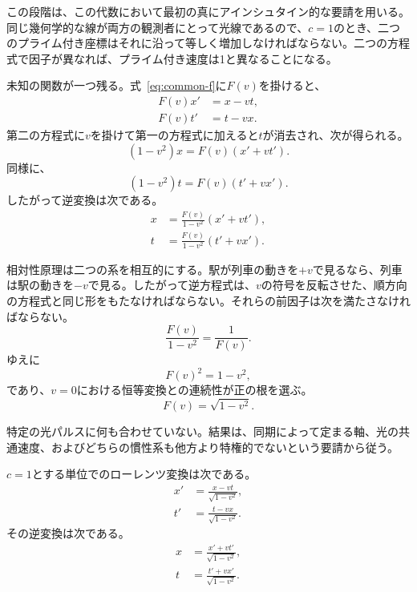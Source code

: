 この段階は、この代数において最初の真にアインシュタイン的な要請を用いる。同じ幾何学的な線が両方の観測者にとって光線であるので、\(c=1\)のとき、二つのプライム付き座標はそれに沿って等しく増加しなければならない。二つの方程式で因子が異なれば、プライム付き速度は1と異なることになる。

未知の関数が一つ残る。式~\eqref{eq:common-f}に\(F(v)\)を掛けると、
\begin{align}
F(v)x'&=x-vt,\\
F(v)t'&=t-vx.
\end{align}
第二の方程式に\(v\)を掛けて第一の方程式に加えると\(t\)が消去され、次が得られる。
\begin{equation}
(1-v^2)x=F(v)(x'+vt').
\end{equation}
同様に、
\begin{equation}
(1-v^2)t=F(v)(t'+vx').
\end{equation}
したがって逆変換は次である。
\begin{align}
x&=\frac{F(v)}{1-v^2}(x'+vt'),\\
t&=\frac{F(v)}{1-v^2}(t'+vx').
\end{align}

相対性原理は二つの系を相互的にする。駅が列車の動きを\(+v\)で見るなら、列車は駅の動きを\(-v\)で見る。したがって逆方程式は、\(v\)の符号を反転させた、順方向の方程式と同じ形をもたなければならない。それらの前因子は次を満たさなければならない。
\begin{equation}
\frac{F(v)}{1-v^2}=\frac{1}{F(v)}.
\end{equation}
ゆえに
\begin{equation}
F(v)^2=1-v^2,
\end{equation}
であり、\(v=0\)における恒等変換との連続性が正の根を選ぶ。
\begin{equation}
F(v)=\sqrt{1-v^2}.
\end{equation}

特定の光パルスに何も合わせていない。結果は、同期によって定まる軸、光の共通速度、およびどちらの慣性系も他方より特権的でないという要請から従う。

\(c=1\)とする単位でのローレンツ変換は次である。
\begin{align}
x'&=\frac{x-vt}{\sqrt{1-v^2}},\\
t'&=\frac{t-vx}{\sqrt{1-v^2}}.
\label{eq:lorentz-c-one}
\end{align}
その逆変換は次である。
\begin{align}
x&=\frac{x'+vt'}{\sqrt{1-v^2}},\\
t&=\frac{t'+vx'}{\sqrt{1-v^2}}.
\end{align}


